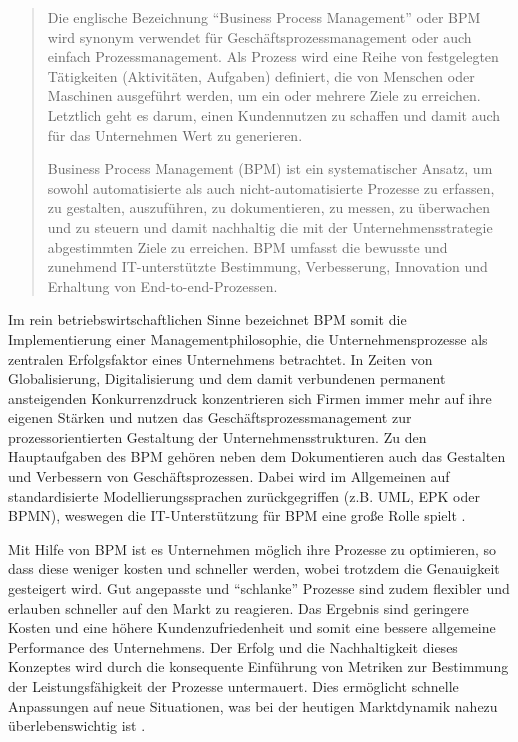 \documentclass[a4paper,12pt]{report}
\begin{document}
\begin{quote}
Die englische Bezeichnung "`Business Process Management"' oder BPM wird synonym verwendet für Geschäftsprozessmanagement oder auch einfach Prozessmanagement. Als Prozess wird eine Reihe von festgelegten Tätigkeiten (Aktivitäten, Aufgaben) definiert, die von Menschen oder Maschinen ausgeführt werden, um ein oder mehrere Ziele zu erreichen. Letztlich geht es darum, einen Kundennutzen zu schaffen und damit auch für das Unternehmen Wert zu generieren.

Business Process Management (BPM) ist ein systematischer Ansatz, um sowohl automatisierte als auch nicht-automatisierte Prozesse zu erfassen, zu gestalten, auszuführen, zu dokumentieren, zu messen, zu überwachen und zu steuern und damit nachhaltig die mit der Unternehmensstrategie abgestimmten Ziele zu erreichen. BPM umfasst die bewusste und zunehmend IT-unterstützte Bestimmung, Verbesserung, Innovation und Erhaltung von End-to-end-Prozessen.
\end{quote}

Im rein betriebswirtschaftlichen Sinne bezeichnet \ac{BPM} somit die Implementierung einer Managementphilosophie, die Unternehmensprozesse als zentralen Erfolgsfaktor eines Unternehmens betrachtet. In Zeiten von Globalisierung, Digitalisierung und dem damit verbundenen permanent ansteigenden Konkurrenzdruck konzentrieren sich Firmen immer mehr auf ihre eigenen Stärken und nutzen das Geschäftsprozessmanagement zur prozessorientierten Gestaltung der Unternehmensstrukturen. Zu den Hauptaufgaben des \ac{BPM} gehören neben dem Dokumentieren auch das Gestalten und Verbessern von Geschäftsprozessen. Dabei wird im Allgemeinen auf standardisierte Modellierungssprachen zurückgegriffen (z.B. UML, EPK oder BPMN), weswegen die IT-Unterstützung für \ac{BPM} eine große Rolle spielt \citep[vgl.][S. 1ff.]{Becker2009}. 

Mit Hilfe von \ac{BPM} ist es Unternehmen möglich ihre Prozesse zu optimieren, so dass diese weniger kosten und schneller werden, wobei trotzdem die Genauigkeit gesteigert wird. Gut angepasste und "`schlanke"' Prozesse sind zudem flexibler und erlauben schneller auf den Markt zu reagieren. Das Ergebnis sind geringere Kosten und eine höhere Kundenzufriedenheit und somit eine bessere allgemeine Performance des Unternehmens. Der Erfolg und die Nachhaltigkeit dieses Konzeptes wird durch die konsequente Einführung von Metriken zur Bestimmung der Leistungsfähigkeit der Prozesse untermauert. Dies ermöglicht schnelle Anpassungen auf neue Situationen, was bei der heutigen Marktdynamik nahezu überlebenswichtig ist \citep[vgl.][S. 7]{Brocke2014}.
\end{document}
